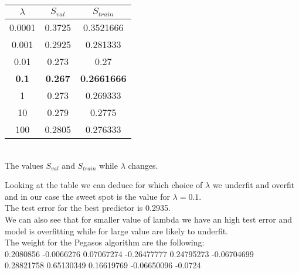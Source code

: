 \begin{center}
    \begin{tabular}{| c | c | c |}
        \hline
        $\lambda$ & $S_{val}$ & $S_{train}$ \\
        \hline
        0.0001 & 0.3725 & 0.3521666 \\
        \hline
        0.001 & 0.2925 & 0.281333 \\
        \hline
        0.01 & 0.273 & 0.27 \\
        \hline
        \textbf{0.1} & \textbf{0.267} & \textbf{0.2661666} \\
        \hline
        1 & 0.273 & 0.269333 \\
        \hline
        10 & 0.279 & 0.2775 \\
        \hline
        100 & 0.2805 & 0.276333 \\
        \hline
    \end{tabular}
    \\
    The values $S_{val}$ and $S_{train}$ while $\lambda$ changes.\\
\end{center}

Looking at the table we can deduce for which choice of $\lambda$ we underfit and overfit and in our case the sweet spot is the value for $\lambda = 0.1$.\\
The test error for the best predictor is 0.2935.\\
We can also see that for smaller value of lambda we have an high test error and model is overfitting while for large value are likely to underfit.\\
The weight for the Pegasos algorithm are the following: \\
0.2080856  -0.0066276   0.07067274 -0.26477777  0.24795273 -0.06704699\\
0.28821758  0.65130349  0.16619769 -0.06650096 -0.0724

